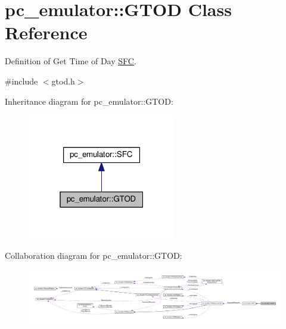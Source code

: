 \hypertarget{classpc__emulator_1_1GTOD}{}\section{pc\+\_\+emulator\+:\+:G\+T\+OD Class Reference}
\label{classpc__emulator_1_1GTOD}


Definition of Get Time of Day \hyperlink{classpc__emulator_1_1SFC}{S\+FC}.  




{\ttfamily \#include $<$gtod.\+h$>$}



Inheritance diagram for pc\+\_\+emulator\+:\+:G\+T\+OD\+:\nopagebreak
\begin{figure}[H]
\begin{center}
\leavevmode
\includegraphics[width=184pt]{classpc__emulator_1_1GTOD__inherit__graph}
\end{center}
\end{figure}


Collaboration diagram for pc\+\_\+emulator\+:\+:G\+T\+OD\+:\nopagebreak
\begin{figure}[H]
\begin{center}
\leavevmode
\includegraphics[width=350pt]{classpc__emulator_1_1GTOD__coll__graph}
\end{center}
\end{figure}
